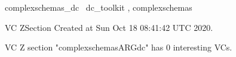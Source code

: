 \documentclass{article}
\begin{document}

\begin{zsection}	 \SECTION complexschemas\_dc \parents~dc\_toolkit , complexschemas
\end{zsection}

\newcommand{\appliesTo}{\zbinop{appliesTo}} 
\newcommand{\appliesToNofix}{\zpreop{appliesToNofix}} 

VC ZSection Created at Sun Oct 18 08:41:42 UTC 2020.



 VC Z section "complexschemasARGdc" has $0$ interesting VCs.



\end{document}
